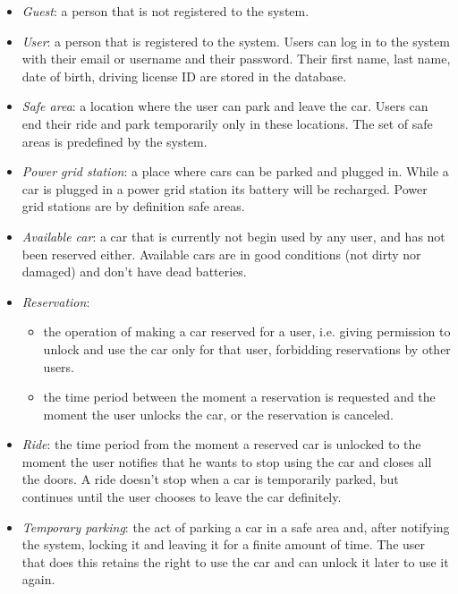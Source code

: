 \documentclass[english]{article}
\begin{document}
\begin{itemize}
\item{\textit{Guest}: a person that is not registered to the system.}
\item{\textit{User}: a person that is registered to the system. Users can log in to the system with their email or username and their password. Their first name, last name, date of birth, driving license ID are stored in the database.}
\item{\textit{Safe area}: a location where the user can park and leave the car. Users can end their ride and park temporarily only in these locations. The set of safe areas is predefined by the system.}
\item{\textit{Power grid station}: a place where cars can be parked and plugged in. While a car is plugged in a power grid station its battery will be recharged. Power grid stations are by definition safe areas.}
\item{\textit{Available car}: a car that is currently not begin used by any user, and has not been reserved either. Available cars are in good conditions (not dirty nor damaged) and don’t have dead batteries.}
\item{\textit{Reservation}:
	\begin{itemize}
		\item{the operation of making a car reserved for a user, i.e. giving permission to unlock and use the car only for that user, forbidding reservations by other users.}
		\item{the time period between the moment a reservation is requested and the moment the user unlocks the car, or the reservation is canceled.}
	\end{itemize}
}
\item{\textit{Ride}: the time period from the moment a reserved car is unlocked to the moment the user notifies that he wants to stop using the car and closes all the doors. A ride doesn’t stop when a car is temporarily parked, but continues until the user chooses to leave the car definitely.}
\item{\textit{Temporary parking}: the act of parking a car in a safe area and, after notifying the system, locking it and leaving it for a finite amount of time. The user that does this retains the right to use the car and can unlock it later to use it again.}

\end{itemize}
\end{document}
